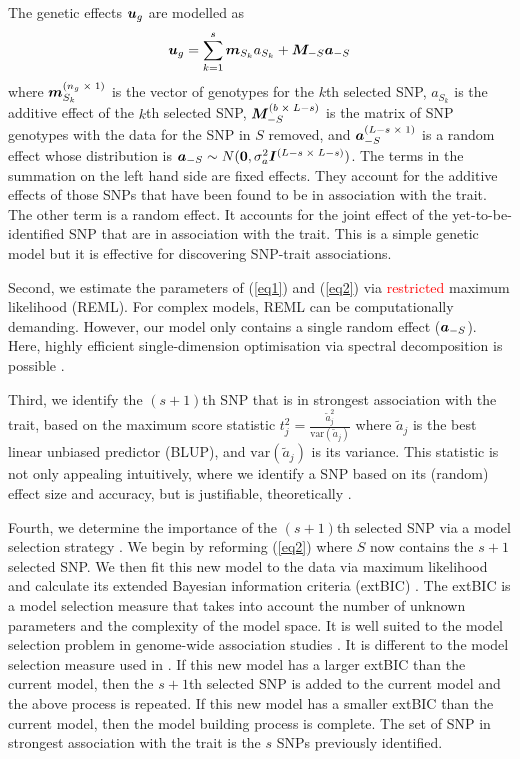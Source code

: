 \documentclass{article}
\begin{document}
The genetic effects $\bm{u}_g$ are modelled as 
\begin{equation}
\label{eq2}
\bm{u}_g = \sum_{k=1}^s  \bm{m}_{S_k} a_{S_k} +\bm{M}_{-S} \bm{a}_{-S}
\end{equation}
where $\bm{m}_{S_k}^{(n_g \; \times \; 1)}$ is the vector of genotypes for the  $k$th selected SNP, 
$a_{S_k}$ is the additive effect of the $k$th selected SNP, $\bm{M}_{-S}^{(b \; \times \; L-s)}$ is the matrix of  SNP genotypes 
with the data for the SNP in $S$ removed,  and $\bm{a}_{-S}^{(L-s \; \times  \; 1)}$ is a random effect whose distribution is 
$\bm{a}_{-S} \sim N(\bm{0}, \sigma_a^2 \bm{I}^{(L-s \; \times \;  L-s)})$. 
The terms in the summation on the left hand side are fixed effects.   They account 
for the additive effects of those SNPs that have been found to be in association with the trait. The other term is a random effect. 
It accounts for the joint effect of the yet-to-be-identified SNP that are in association with the trait. 
This is a simple genetic model but it 
is effective for discovering SNP-trait associations. 


Second, we estimate the parameters of (\ref{eq1}) and (\ref{eq2}) via \textcolor{red}{restricted} maximum likelihood (REML).  For complex models, REML
can be computationally demanding. However, our model only contains a single random effect ($\bm{a}_{-S}$). Here, highly efficient single-dimension 
optimisation via spectral decomposition is possible \citep{kang2008efficient}. 

Third, we identify the $(s+1)$th SNP that is in strongest association with the trait, based on the maximum score statistic
$t_j^2 = \frac{ \widetilde{a} _j^2}{\textrm{var}(\widetilde{a}_j)}$ where $\widetilde{a}_j$ is the best linear unbiased predictor (BLUP), 
and $\textrm{var}(\widetilde{a}_j)$ is its variance. This statistic is not only appealing intuitively, where we 
identify a SNP based on its (random) effect size and accuracy, but is justifiable, theoretically \citep{verbyla2012rwgaim}.

Fourth, we determine the importance of the $(s+1)$th selected SNP via a model selection strategy  \citep{verbyla2007analysis}. 
We begin by reforming (\ref{eq2}) where $S$ now contains the $s + 1$ selected SNP.  We then fit this new model to the data
via maximum likelihood and calculate its extended Bayesian information criteria (extBIC) \citep{chen2008extended}.  The 
extBIC is a model selection measure that takes into account the number of unknown parameters and the complexity 
of the model space.  It is well suited to the model selection problem in genome-wide association studies \citep{chen2008extended}. 
It is different to the model selection measure used in  \citep{verbyla2007analysis}.
If this new model has a larger extBIC than the current model, then the $s+1$th selected SNP is added to 
the current model and the above process is repeated. If this new model has a smaller extBIC than the current model, then the 
model building process is complete. The set of SNP in strongest association with the trait is the $s$ SNPs previously identified. 
\end{document}
